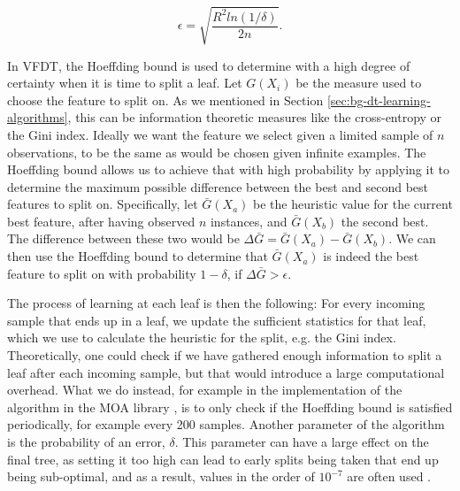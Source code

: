\begin{equation}
	\epsilon = \sqrt{\frac{R^2ln(1/\delta)}{2n}}.
\end{equation}

In VFDT, the Hoeffding bound is used to determine with a high degree of certainty when
it is time to split a leaf. Let $G(X_i)$ be the measure used to choose the feature
to split on. As we mentioned in Section \ref{sec:bg-dt-learning-algorithms}, this can be
information theoretic measures like the cross-entropy or the Gini index. Ideally we want the feature we select given a limited sample of $n$ observations, to be the same as would be chosen given infinite examples.
The Hoeffding bound allows us to achieve that with high probability by applying
it to determine the maximum possible difference between the best and second best
features to split on. Specifically, let $\bar{G}(X_a)$ be the heuristic value for the
current best feature, after having observed $n$ instances, and $\bar{G}(X_b)$ the second
best. The difference between these two would be $\Delta \bar{G} = \bar{G}(X_a) - \bar{G}(X_b)$.
We can then use the Hoeffding bound to determine that $\bar{G}(X_a)$ is indeed the
best feature to split on with probability $1-\delta$, if $\Delta \bar{G} > \epsilon$.

The process of learning at each leaf is then the following: For every incoming sample
that ends up in a leaf, we update the sufficient statistics for that leaf, which we
use to calculate the heuristic for the split, e.g. the Gini index. Theoretically,
one could check if we have gathered enough information to split a leaf after each
incoming sample, but that would introduce a large computational overhead. What we
do instead, for example in the implementation of the algorithm in the MOA library \cite{bifet2010moa},
is to only check if the Hoeffding bound is satisfied periodically, for example
every 200 samples. Another parameter of the algorithm is the probability of an error,
$\delta$. This parameter can have a large effect on the final tree, as setting it
too high can lead to early splits being taken that end up being sub-optimal, and as a result,
values in the order of $10^{-7}$ are often used \cite{data-stream-mining}.

